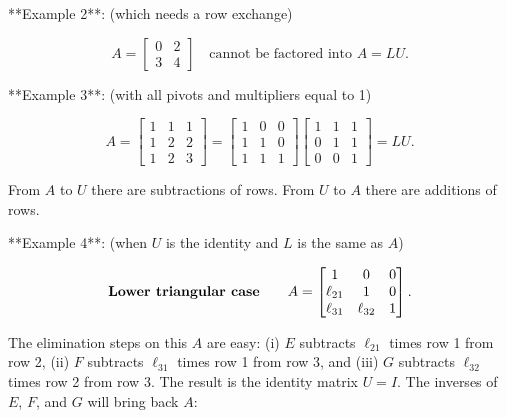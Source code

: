 **Example 2**: (which needs a row exchange)

\[A=\begin{bmatrix}0&2\\ 3&4\end{bmatrix}\quad\text{cannot be factored into }A=LU.\]

**Example 3**: (with all pivots and multipliers equal to 1)

\[A=\begin{bmatrix}1&1&1\\ 1&2&2\\ 1&2&3\end{bmatrix}=\begin{bmatrix}1&0&0\\ 1&1&0\\ 1&1&1\end{bmatrix}\begin{bmatrix}1&1&1\\ 0&1&1\\ 0&0&1\end{bmatrix}=LU.\]

From \(A\) to \(U\) there are subtractions of rows. From \(U\) to \(A\) there are additions of rows.

**Example 4**: (when \(U\) is the identity and \(L\) is the same as \(A\))

\[\text{\bf Lower triangular case}\qquad A=\begin{bmatrix}1&0&0\\ \ell_{21}&1&0\\ \ell_{31}&\ell_{32}&1\end{bmatrix}.\]

The elimination steps on this \(A\) are easy: (i) \(E\) subtracts \(\ell_{21}\) times row 1 from row 2, (ii) \(F\) subtracts \(\ell_{31}\) times row 1 from row 3, and (iii) \(G\) subtracts \(\ell_{32}\) times row 2 from row 3. The result is the identity matrix \(U=I\). The inverses of \(E\), \(F\), and \(G\) will bring back \(A\): 